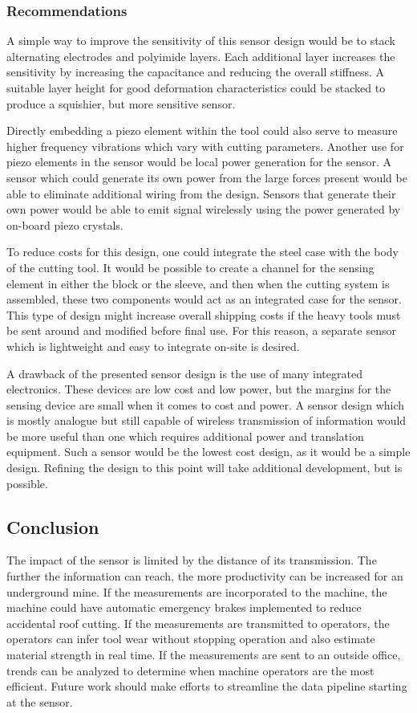 \subsubsection{Recommendations}

A simple way to improve the sensitivity of this sensor design would be to stack alternating electrodes and polyimide layers.
Each additional layer increases the sensitivity by increasing the capacitance and reducing the overall stiffness.
A suitable layer height for good deformation characteristics could be stacked to produce a squishier, but more sensitive sensor.

Directly embedding a piezo element within the tool could
also serve to measure higher frequency vibrations which vary with cutting parameters.
Another use for piezo elements in the sensor would be local power generation for the sensor. 
A sensor which could generate its own power from the large forces present would be able to 
eliminate additional wiring from the design. Sensors that generate their own power would be able to 
emit signal wirelessly using the power generated by on-board piezo crystals.

To reduce costs for this design, one could integrate the steel case with the body of the cutting tool.
It would be possible to create a channel for the sensing element in either the block or the sleeve, and then
when the cutting system is assembled, these two components would act as an integrated case for the sensor.
This type of design might increase overall shipping costs if the heavy tools must be sent around and modified before final use.
For this reason, a separate sensor which is lightweight and easy to integrate on-site is desired.

A drawback of the presented sensor design is the use of many integrated electronics. These devices are low cost and low power,
but the margins for the sensing device are small when it comes to cost and power. A sensor design which is mostly analogue but
still capable of wireless transmission of information would be more useful than one which requires additional power
and translation equipment. Such a sensor would be the lowest cost design, as it would be a simple design.
Refining the design to this point will take additional development, but is possible.

\subsection{Conclusion}

The impact of the sensor is limited by the distance of its transmission. 
The further the information can reach, the more productivity can be increased for an underground mine.
If the measurements are incorporated to the machine, the machine could have automatic emergency brakes 
implemented to reduce accidental roof cutting. If the measurements are transmitted to operators, the operators
can infer tool wear without stopping operation and also estimate material strength in real time.
If the measurements are sent to an outside office, trends can be analyzed to determine when machine operators
are the most efficient. Future work should make efforts to streamline the data pipeline starting at the sensor.


